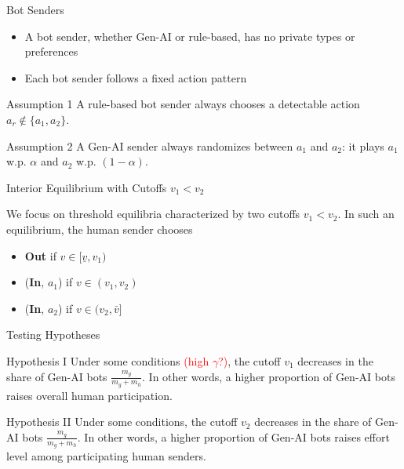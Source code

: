 \documentclass[11pt,aspectratio=169]{beamer}
\begin{document}
\begin{frame}{Bot Senders}
\begin{itemize}\setlength{\itemsep}{1em}
    \item A bot sender, whether Gen-AI or rule-based, has no private types or preferences
    \item Each bot sender follows a fixed action pattern
\end{itemize}
\vspace{1em}

\begin{exampleblock}{Assumption 1}
    A rule-based bot sender always chooses a detectable action $a_r\notin\{a_1,a_2\}$.
\end{exampleblock}

\begin{exampleblock}{Assumption 2}
    A Gen-AI sender always randomizes between $a_1$ and $a_2$: it plays $a_1$ w.p. $\alpha$ and $a_2$ w.p. $(1-\alpha)$.
\end{exampleblock}
\end{frame}

\begin{frame}{Interior Equilibrium with Cutoffs $v_1<v_2$}

We focus on threshold equilibria characterized by two cutoffs $v_1<v_2$. In such an equilibrium, the human sender chooses
\begin{itemize}
    \item \textbf{Out} if $v\in [\underline{v},v_1)$
    \item (\textbf{In}, $a_1$) if $v\in (v_1,v_2)$
    \item (\textbf{In}, $a_2$) if $v\in (v_2,\bar{v}]$
\end{itemize}

\end{frame}

\begin{frame}{Testing Hypotheses}

\begin{exampleblock}{Hypothesis I}
    Under some conditions \textcolor{red}{(high $\gamma$?)}, the cutoff $v_1$ decreases in the share of Gen-AI bots $\frac{m_g}{m_g+m_h}$. In other words, a higher proportion of Gen-AI bots raises overall human participation.
\end{exampleblock}
\vspace{2em}

\begin{exampleblock}{Hypothesis II}
    Under some conditions, the cutoff $v_2$ decreases in the share of Gen-AI bots $\frac{m_g}{m_g+m_h}$. In other words, a higher proportion of Gen-AI bots raises effort level among participating human senders.
\end{exampleblock}
    
\end{frame}
\end{document}
